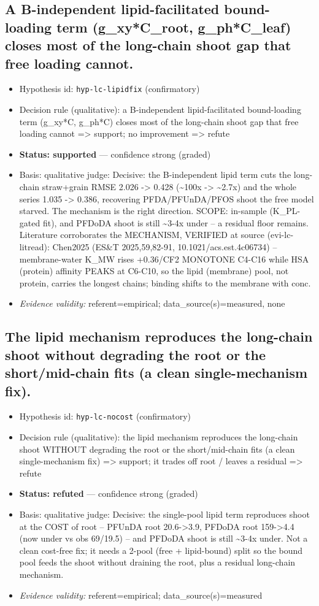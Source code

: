 \documentclass{article}
\begin{document}
\subsection{A B-independent lipid-facilitated bound-loading term (g\_xy*C\_root, g\_ph*C\_leaf) closes most of the long-chain shoot gap that free loading cannot.}
\begin{itemize}
  \item Hypothesis id: \texttt{hyp-lc-lipidfix} (confirmatory)
  \item Decision rule (qualitative): a B-independent lipid-facilitated bound-loading term (g\_xy*C, g\_ph*C) closes most of the long-chain shoot gap that free loading cannot => support; no improvement => refute
  \item \textbf{Status: supported} --- confidence strong (graded)
  \item Basis: qualitative judge: Decisive: the B-independent lipid term cuts the long-chain straw+grain RMSE 2.026 -> 0.428 (\textasciitilde{}100x -> \textasciitilde{}2.7x) and the whole series 1.035 -> 0.386, recovering PFDA/PFUnDA/PFOS shoot the free model starved. The mechanism is the right direction. SCOPE: in-sample (K\_PL-gated fit), and PFDoDA shoot is still \textasciitilde{}3-4x under -- a residual floor remains. Literature corroborates the MECHANISM, VERIFIED at source (evi-lc-litread): Chen2025 (ES\&T 2025,59,82-91, 10.1021/acs.est.4c06734) -- membrane-water K\_MW rises +0.36/CF2 MONOTONE C4-C16 while HSA (protein) affinity PEAKS at C6-C10, so the lipid (membrane) pool, not protein, carries the longest chains; binding shifts to the membrane with conc.
  \item \textit{Evidence validity:} referent=empirical; data\_source(s)=measured, none
\end{itemize}

\subsection{The lipid mechanism reproduces the long-chain shoot without degrading the root or the short/mid-chain fits (a clean single-mechanism fix).}
\begin{itemize}
  \item Hypothesis id: \texttt{hyp-lc-nocost} (confirmatory)
  \item Decision rule (qualitative): the lipid mechanism reproduces the long-chain shoot WITHOUT degrading the root or the short/mid-chain fits (a clean single-mechanism fix) => support; it trades off root / leaves a residual => refute
  \item \textbf{Status: refuted} --- confidence strong (graded)
  \item Basis: qualitative judge: Decisive: the single-pool lipid term reproduces shoot at the COST of root -- PFUnDA root 20.6->3.9, PFDoDA root 159->4.4 (now under vs obs 69/19.5) -- and PFDoDA shoot is still \textasciitilde{}3-4x under. Not a clean cost-free fix; it needs a 2-pool (free + lipid-bound) split so the bound pool feeds the shoot without draining the root, plus a residual long-chain mechanism.
  \item \textit{Evidence validity:} referent=empirical; data\_source(s)=measured
\end{itemize}
\end{document}

